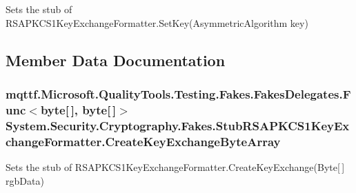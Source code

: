 Sets the stub of R\-S\-A\-P\-K\-C\-S1\-Key\-Exchange\-Formatter.\-Set\-Key(\-Asymmetric\-Algorithm key)



\subsection{Member Data Documentation}
\hypertarget{class_system_1_1_security_1_1_cryptography_1_1_fakes_1_1_stub_r_s_a_p_k_c_s1_key_exchange_formatter_a1369fb1a97826f2b2348cc444fd46331}{
\subsubsection[{Create\-Key\-Exchange\-Byte\-Array}]{\setlength{\rightskip}{0pt plus 5cm}mqttf.\-Microsoft.\-Quality\-Tools.\-Testing.\-Fakes.\-Fakes\-Delegates.\-Func$<$byte\mbox{[}$\,$\mbox{]}, byte\mbox{[}$\,$\mbox{]}$>$ System.\-Security.\-Cryptography.\-Fakes.\-Stub\-R\-S\-A\-P\-K\-C\-S1\-Key\-Exchange\-Formatter.\-Create\-Key\-Exchange\-Byte\-Array}}\label{class_system_1_1_security_1_1_cryptography_1_1_fakes_1_1_stub_r_s_a_p_k_c_s1_key_exchange_formatter_a1369fb1a97826f2b2348cc444fd46331}


Sets the stub of R\-S\-A\-P\-K\-C\-S1\-Key\-Exchange\-Formatter.\-Create\-Key\-Exchange(\-Byte\mbox{[}$\,$\mbox{]} rgb\-Data)

